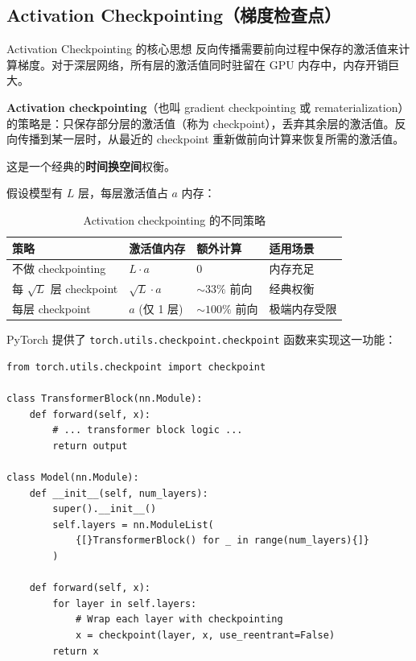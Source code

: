 \documentclass[a4paper]{article}
\begin{document}
\subsection{Activation Checkpointing（梯度检查点）}

\begin{importantbox}{Activation Checkpointing 的核心思想}
反向传播需要前向过程中保存的激活值来计算梯度。对于深层网络，所有层的激活值同时驻留在 GPU 内存中，内存开销巨大。

\textbf{Activation checkpointing}（也叫 gradient checkpointing 或 rematerialization）的策略是：只保存部分层的激活值（称为 checkpoint），丢弃其余层的激活值。反向传播到某一层时，从最近的 checkpoint 重新做前向计算来恢复所需的激活值。

这是一个经典的\textbf{时间换空间}权衡。
\end{importantbox}

假设模型有 $L$ 层，每层激活值占 $a$ 内存：

\begin{table}[H]
\centering
\begin{tabular}{p{}p{}p{}p{}}
\toprule
\textbf{策略} & \textbf{激活值内存} & \textbf{额外计算} & \textbf{适用场景} \\
\midrule
不做 checkpointing & $L \cdot a$ & 0 & 内存充足 \\
每 $\sqrt{L}$ 层 checkpoint & $\sqrt{L} \cdot a$ & $\sim 33\%$ 前向 & 经典权衡 \\
每层 checkpoint & $a$ (仅 1 层) & $\sim 100\%$ 前向 & 极端内存受限 \\
\bottomrule
\end{tabular}
\caption{Activation checkpointing 的不同策略}
\end{table}

PyTorch 提供了 \texttt{torch.utils.checkpoint.checkpoint} 函数来实现这一功能：

\begin{lstlisting}[caption={使用 activation checkpointing 的示例}]
from torch.utils.checkpoint import checkpoint

class TransformerBlock(nn.Module):
    def forward(self, x):
        # ... transformer block logic ...
        return output

class Model(nn.Module):
    def __init__(self, num_layers):
        super().__init__()
        self.layers = nn.ModuleList(
            {[}TransformerBlock() for _ in range(num_layers){]}
        )

    def forward(self, x):
        for layer in self.layers:
            # Wrap each layer with checkpointing
            x = checkpoint(layer, x, use_reentrant=False)
        return x
\end{lstlisting}
\end{document}
